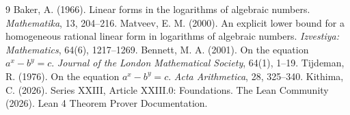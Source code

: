 \documentclass[11pt,a4paper]{article}
\begin{document}

\begin{thebibliography}{9}
  Baker, A. (1966). Linear forms in the logarithms of algebraic numbers. \emph{Mathematika}, 13, 204–216.
  Matveev, E. M. (2000). An explicit lower bound for a homogeneous rational linear form in logarithms of algebraic numbers. \emph{Izvestiya: Mathematics}, 64(6), 1217–1269.
  Bennett, M. A. (2001). On the equation $a^x - b^y = c$. \emph{Journal of the London Mathematical Society}, 64(1), 1–19.
  Tijdeman, R. (1976). On the equation $a^x - b^y = c$. \emph{Acta Arithmetica}, 28, 325–340.
  Kithima, C. (2026). Series XXIII, Article XXIII.0: Foundations.
  The Lean Community (2026). Lean 4 Theorem Prover Documentation.
\end{thebibliography}
\end{document}
